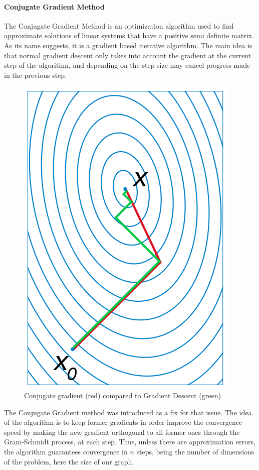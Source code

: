 \documentclass{article}
\theoremstyle{definition}
\begin{document}
\paragraph{Conjugate Gradient Method}
The Conjugate Gradient Method\cite{nesterov_lectures_2018} is an optimization algorithm used to find approximate solutions of linear systems that have a positive semi definite matrix. As its name suggests, it is a gradient based iterative algorithm. The main idea is that normal gradient descent only takes into account the gradient at the current step of the algorithm, and depending on the step size may cancel progress made in the previous step.
\begin{figure}[!htb]
	\centering
	\includegraphics[height=0.3\textheight]{data/sota/conj_grad.png}
	\caption{Conjugate gradient (red) compared to Gradient Descent (green)}
	\label{fig:conj_grad}
\end{figure} 
The Conjugate Gradient method was introduced as a fix for that issue. The idea of the algorithm is to keep former gradients in order improve the convergence speed by making the new gradient orthogonal to all former ones through the Gram-Schmidt process, at each step. Thus, unless there are approximation errors, the algorithm guarantees convergence in $n$ steps, being the number of dimensions of the problem, here the size of our graph.\\
\end{document}
